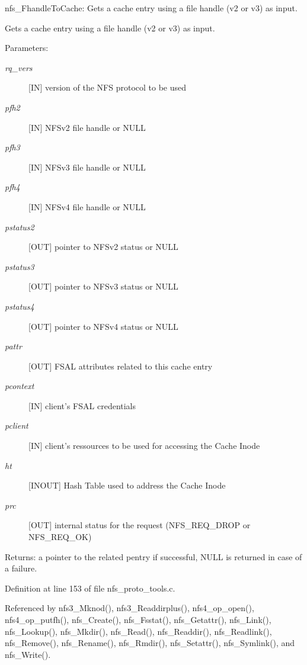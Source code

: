 nfs\_\-Fhandle\-To\-Cache: Gets a cache entry using a file handle (v2 or v3) as input.

Gets a cache entry using a file handle (v2 or v3) as input.

\begin{Desc}
\item[Parameters:]
\begin{description}
\item[{\em rq\_\-vers}][IN] version of the NFS protocol to be used \item[{\em pfh2}][IN] NFSv2 file handle or NULL \item[{\em pfh3}][IN] NFSv3 file handle or NULL \item[{\em pfh4}][IN] NFSv4 file handle or NULL \item[{\em pstatus2}][OUT] pointer to NFSv2 status or NULL \item[{\em pstatus3}][OUT] pointer to NFSv3 status or NULL \item[{\em pstatus4}][OUT] pointer to NFSv4 status or NULL \item[{\em pattr}][OUT] FSAL attributes related to this cache entry \item[{\em pcontext}][IN] client's FSAL credentials \item[{\em pclient}][IN] client's ressources to be used for accessing the Cache Inode \item[{\em ht}][INOUT] Hash Table used to address the Cache Inode \item[{\em prc}][OUT] internal status for the request (NFS\_\-REQ\_\-DROP or NFS\_\-REQ\_\-OK)\end{description}
\end{Desc}
\begin{Desc}
\item[Returns:]a pointer to the related pentry if successful, NULL is returned in case of a failure. \end{Desc}


Definition at line 153 of file nfs\_\-proto\_\-tools.c.

Referenced by nfs3\_\-Mknod(), nfs3\_\-Readdirplus(), nfs4\_\-op\_\-open(), nfs4\_\-op\_\-putfh(), nfs\_\-Create(), nfs\_\-Fsstat(), nfs\_\-Getattr(), nfs\_\-Link(), nfs\_\-Lookup(), nfs\_\-Mkdir(), nfs\_\-Read(), nfs\_\-Readdir(), nfs\_\-Readlink(), nfs\_\-Remove(), nfs\_\-Rename(), nfs\_\-Rmdir(), nfs\_\-Setattr(), nfs\_\-Symlink(), and nfs\_\-Write().
